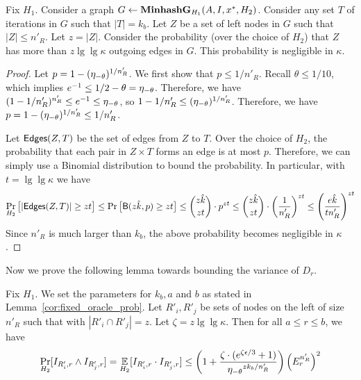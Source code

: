 \begin{lemma}\label{lem:edges}
Fix $H_1$.  Consider a graph $G \leftarrow {\bf MinhashG}_{H_1}(A, I, {x^*}, H_2)$.
Consider any set $T$ of iterations in $G$ such that $|T| = k_b$. 
%
Let $Z$ be a set of left nodes in $G$ such that $|Z| \le n'_R$. Let $z = |Z|$. Consider the probability (over the choice of $H_2$) that $Z$ has more than $z \lg\lg \kappa$ outgoing edges in $G$. This probability is negligible in $\kappa$.
\end{lemma}

\begin{proof}
Let $p = 1 - ({\eta_{-\theta}})^{1/n'_R}$.  We first show that $p \le 1/n'_R.$
Recall $\theta \le 1/10$, which implies $e^{-1} \le 1/2 - \theta = {\eta_{-\theta}}$. Therefore, we have
$(1-1/n_R')^{n_R'} \le e^{-1} \le {\eta_{-\theta}}$, so 
$1-1/n_R' \le ({\eta_{-\theta}})^{1/n_R'}$. Therefore, we have $p = 1 - ({\eta_{-\theta}})^{1/n'_R} \le 1/n'_R$.

Let ${\mathsf{Edges}}(Z, T)$ be the set of edges from $Z$ to $T$. Over the choice of $H_2$, the probability that each pair in $Z \times T$ forms an edge is at most $p$. Therefore, we can simply use a Binomial distribution to bound the probability. In particular, 
with $t = \lg\lg \kappa$ we have
\begin{align*}
\Pr_{H_2}\big[ |{\mathsf{Edges}}(Z,T)| \ge zt\big] \le \Pr \big[ \mathsf{B}(z\hat{k}, p) \ge zt \big]  
\le \binom{z\hat{k}}{zt} \cdot p^{zt} 
\le \binom{z\hat{k}}{zt} \cdot \left(\frac{1}{n_R'}\right)^{zt} 
\le \left(\frac{e \hat{k}}{t n'_R}\right)^{zt}\end{align*}
Since $n'_R$ is much larger than $k_b$, the above probability becomes negligible in $\kappa$. 
\end{proof}

%
Now we prove the following lemma towards bounding the variance of $D_r$. 
\begin{lemma} \label{lem:dependency}
Fix $H_1$. 
We set the parameters for $k_b, a$ and $b$ as stated in Lemma~\ref{cor:fixed_oracle_prob}.
Let $R'_i, R'_j$ be sets of nodes on the left of size $n'_R$ such that
with $|R'_i \cap R'_j| = z$.
Let $\zeta = z \lg\lg\kappa$.
%
Then for all $a \leq r \leq b$, we
have  
\begin{align*}
\Pr_{H_2}[I_{R'_i,r} \wedge I_{R'_j, r}]
= \operatorname*{\mathbb{E}}_{H_2}[I_{R'_i,r} \cdot I_{R'_j, r}]
\leq  \left(  1  + \frac{\zeta \cdot (e^{\zeta \epsilon/3}+1)}{{\eta_{-\theta}}^{z k_b/n'_R} } \right) \left(E^{n'_R}_r\right)^2 
\end{align*}
\end{lemma}


